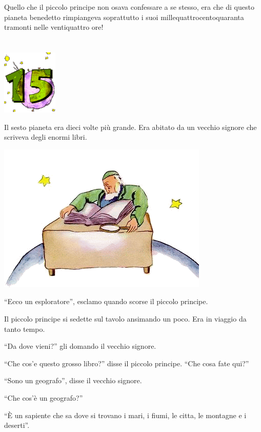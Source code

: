 \documentclass[11pt]{scrbook}
\begin{document}
Quello che il piccolo principe non osava confessare a se stesso, era che
di questo pianeta benedetto rimpiangeva soprattutto i suoi
millequattrocentoquaranta tramonti nelle ventiquattro ore!

\chapter{}
\begin{center}
\includegraphics{img/chapter15}
\end{center}

Il sesto pianeta era dieci volte più grande. Era abitato da un vecchio
signore che scriveva degli enormi libri.

\begin{center}
\includegraphics{img/15a}
\end{center}

``Ecco un esploratore'', esclamo quando scorse il piccolo principe.

Il piccolo principe si sedette sul tavolo ansimando un poco. Era in
viaggio da tanto tempo.

``Da dove vieni?'' gli domando il vecchio signore.

``Che cos'e questo grosso libro?'' disse il piccolo principe. ``Che cosa
fate qui?''

``Sono un geografo'', disse il vecchio signore.

``Che cos'è un geografo?''

``È un sapiente che sa dove si trovano i mari, i fiumi, le citta, le
montagne e i deserti''.
\end{document}
